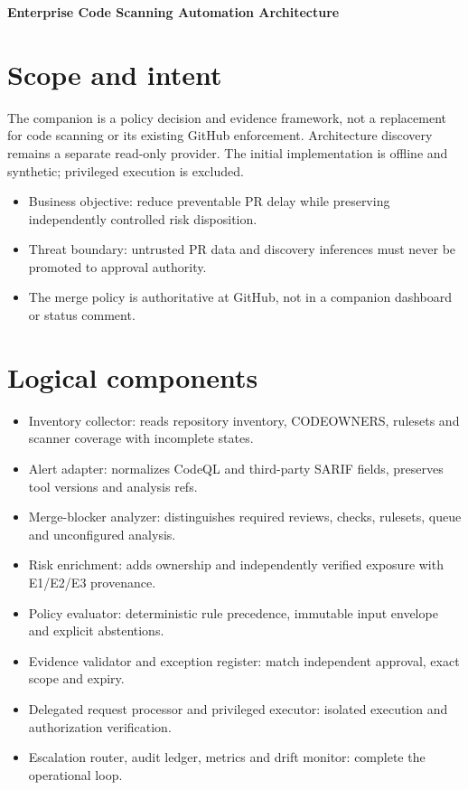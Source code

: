 \documentclass[11pt,letterpaper]{article}
\begin{document}
\begin{center}
{\LARGE\bfseries Enterprise Code Scanning Automation Architecture}\par
\vspace{5pt}{\large Companion to GitHub Actions Architecture Discovery at Enterprise Scale}\par
\vspace{9pt}{\small Engineering reference | Proposed design | Not a deployment or approval record}\par
\end{center}
\tableofcontents
\clearpage
\section{Scope and intent}
The companion is a policy decision and evidence framework, not a replacement for code scanning or its existing GitHub enforcement. Architecture discovery remains a separate read-only provider. The initial implementation is offline and synthetic; privileged execution is excluded.

\begin{itemize}
\item Business objective: reduce preventable PR delay while preserving independently controlled risk disposition.
\item Threat boundary: untrusted PR data and discovery inferences must never be promoted to approval authority.
\item The merge policy is authoritative at GitHub, not in a companion dashboard or status comment.
\end{itemize}

\section{Logical components}
\begin{itemize}
\item Inventory collector: reads repository inventory, CODEOWNERS, rulesets and scanner coverage with incomplete states.
\item Alert adapter: normalizes CodeQL and third-party SARIF fields, preserves tool versions and analysis refs.
\item Merge-blocker analyzer: distinguishes required reviews, checks, rulesets, queue and unconfigured analysis.
\item Risk enrichment: adds ownership and independently verified exposure with E1/E2/E3 provenance.
\item Policy evaluator: deterministic rule precedence, immutable input envelope and explicit abstentions.
\item Evidence validator and exception register: match independent approval, exact scope and expiry.
\item Delegated request processor and privileged executor: isolated execution and authorization verification.
\item Escalation router, audit ledger, metrics and drift monitor: complete the operational loop.
\end{itemize}
\end{document}
